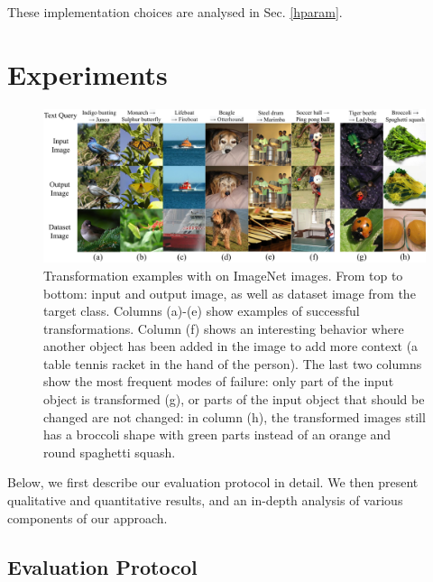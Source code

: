 These implementation choices are analysed in Sec. \ref{hparam}.



\section{Experiments}

\begin{figure}
    \centering
    \vspace{-2em}
    \includegraphics[width=.95\linewidth]{images/flexit/assets/main_exs.pdf}
    \caption{Transformation examples with \ours on ImageNet images. 
    From top to bottom: input and output image, as well as dataset image from the target
     class.
    Columns (a)-(e) show examples of successful transformations. Column (f) shows an
     interesting behavior where another object has been added in the image to add more 
     context (a table tennis racket in the hand of the person). The  last two columns 
      show the most frequent modes of failure: only part of the input object is
       transformed (g), or parts of the input object that should be changed are not 
       changed: in column (h), the transformed images still has a broccoli shape with 
       green parts instead of an orange and round spaghetti squash.
    }
    \label{fig:visuresu}
    \vspace{-.5em}
\end{figure}


Below, we first describe  our evaluation protocol in detail. 
We then present qualitative and quantitative results,  and an in-depth analysis of
 various components of our approach.


\subsection{Evaluation Protocol\label{eval}}


